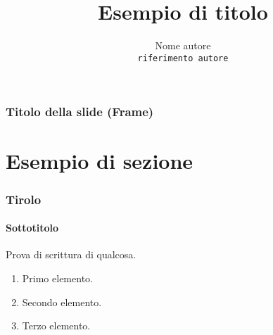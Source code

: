 \documentclass{beamer}
\title{Esempio di titolo}
\author{Nome autore \\ \texttt{riferimento autore}}
\institute{Nome istituto}
\begin{document}
	\begin{frame} 
		\maketitle 
	\end{frame}

	\begin{frame} 
		\frametitle{Titolo della slide (Frame)} 
		\tableofcontents 
	\end{frame}

	\section{Esempio di sezione} 
	\begin{frame} 
		\frametitle{Tirolo} 
		\framesubtitle{Sottotitolo} 

			Prova di scrittura di qualcosa.

	\pause 
	
		\begin{enumerate}
			\item Primo elemento. 
			\item Secondo elemento.
			\item Terzo elemento.
			\qedhere 
		\end{enumerate} 

\end{frame}
\end{document}
